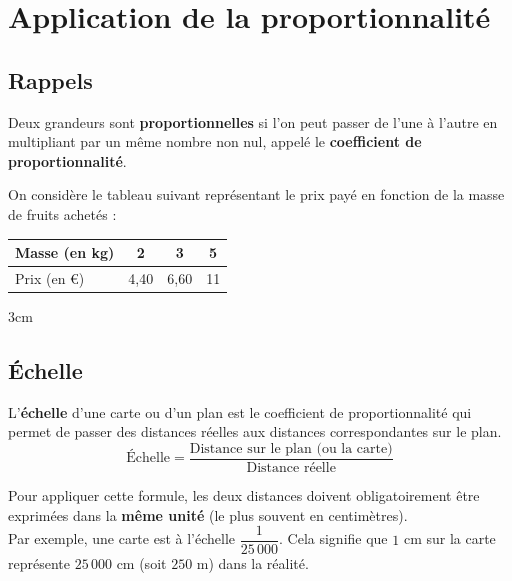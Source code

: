 \documentclass[a4paper]{book}
\begin{document}
\setcounter{chapter}{13}
\renewcommand{\monTitre}{Application de la proportionnalité}
\chapter{\monTitre}
\thispagestyle{fancy}


\section{Rappels}

    \begin{definition}[Proportionnalité]
        Deux grandeurs sont \textbf{proportionnelles} si l'on peut passer de l'une à l'autre en multipliant par un même nombre non nul, appelé le \textbf{coefficient de proportionnalité}.
    \end{definition}

    
    \begin{exemple}
        On considère le tableau suivant représentant le prix payé en fonction de la masse de fruits achetés :
        \begin{center}
        \renewcommand{\arraystretch}{1.5}
        \begin{tabular}{|l|c|c|c|}
        \hline
        Masse (en kg) & 2 & 3 & 5 \\ \hline
        Prix (en \euro) & 4,40 & 6,60 & 11 \\ \hline
        \end{tabular}
        \end{center}
        \begin{ZoneReponse}{3cm}
        \end{ZoneReponse}
    \end{exemple}


\section{Échelle}
    \begin{definition}[Échelle]
        L'\textbf{échelle} d'une carte ou d'un plan est le coefficient de proportionnalité qui permet de passer des distances réelles aux distances correspondantes sur le plan.
        \[ \text{Échelle} = \frac{\text{Distance sur le plan (ou la carte)}}{\text{Distance réelle}} \]
    \end{definition}


    \begin{remarque}
        Pour appliquer cette formule, les deux distances doivent obligatoirement être exprimées dans la \textbf{même unité} (le plus souvent en centimètres). \\
        Par exemple, une carte est à l'échelle $\dfrac{1}{25\,000}$. Cela signifie que $1$ cm sur la carte représente $25\,000$ cm (soit $250$ m) dans la réalité.
    \end{remarque}
\end{document}
